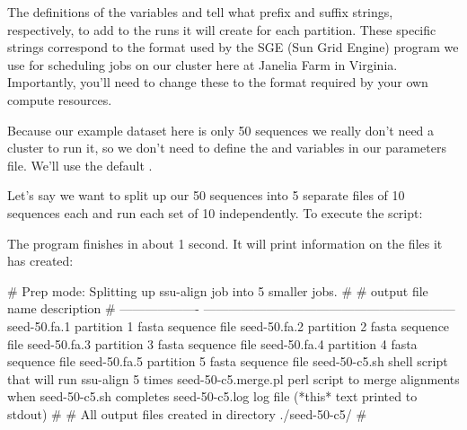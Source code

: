 The definitions of the variables  and
 tell  what prefix and suffix
strings, respectively, to add to the  runs it will
create for each partition. These specific strings correspond to the
format used by the SGE (Sun Grid Engine)  program we use
for scheduling jobs on our cluster here at Janelia Farm in Virginia.
Importantly, you'll need to change these to the format required by
your own compute resources.

Because our example dataset here is only 50 sequences we really don't
need a cluster to run it, so we don't need to define the
 and  variables in our
parameters file. We'll use the default .

Let's say we want to split up our 50 sequences into 5 separate files
of 10 sequences each and run each set of 10 independently. 
To execute the script:


The program finishes in about 1 second. It will print information on
the files it has created:

\begin{comment}
# ssu-align :: define and align SSU rRNA sequences
# SSU-ALIGN 0.1 (June 2009)
# Copyright (C) 2009 HHMI Janelia Farm Research Campus
# Freely distributed under the GNU General Public License (GPLv3)
# - - - - - - - - - - - - - - - - - - - - - - - - - - - - - - - - - - - -
# command: /groups/eddy/home/nawrockie/ssualign/ssu-align -F -c 5 ../../seeds/ssu5-0p1.cm seed-50.fa seed-50-c5 ../../sa-0p1.params
# date:    Thu Jun 18 16:27:21 2009
#
\end{comment}
\begin{sreoutput}
# Prep mode: Splitting up ssu-align job into 5 smaller jobs.
#
# output file name     description                                                 
# -------------------  ------------------------------------------------------------
  seed-50.fa.1         partition 1 fasta sequence file
  seed-50.fa.2         partition 2 fasta sequence file
  seed-50.fa.3         partition 3 fasta sequence file
  seed-50.fa.4         partition 4 fasta sequence file
  seed-50.fa.5         partition 5 fasta sequence file
  seed-50-c5.sh        shell script that will run ssu-align 5 times
  seed-50-c5.merge.pl  perl script to merge alignments when seed-50-c5.sh completes
  seed-50-c5.log       log file (*this* text printed to stdout)
#
# All output files created in directory ./seed-50-c5/
#
\end{sreoutput}

